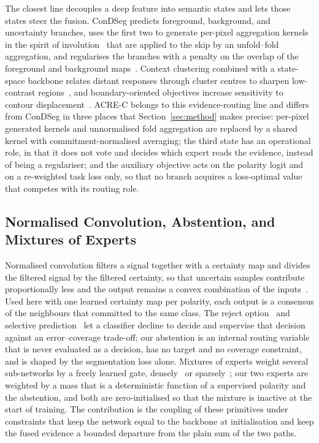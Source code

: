 The closest line decouples a deep feature into semantic states and lets those states steer the fusion. ConDSeg predicts foreground, background, and uncertainty branches, uses the first two to generate per-pixel aggregation kernels in the spirit of involution~\cite{li2021involution} that are applied to the skip by an unfold--fold aggregation, and regularises the branches with a penalty on the overlap of the foreground and background maps~\cite{lei2025condseg}. Context clustering combined with a state-space backbone relates distant responses through cluster centres to sharpen low-contrast regions~\cite{zhu2025ccvim}, and boundary-oriented objectives increase sensitivity to contour displacement~\cite{kervadec2019boundary,karimi2019reducing,wang2022banet}. ACRE-C belongs to this evidence-routing line and differs from ConDSeg in three places that Section~\ref{sec:method} makes precise: per-pixel generated kernels and unnormalised fold aggregation are replaced by a shared kernel with commitment-normalised averaging; the third state has an operational role, in that it does not vote and decides which expert reads the evidence, instead of being a regulariser; and the auxiliary objective acts on the polarity logit and on a re-weighted task loss only, so that no branch acquires a loss-optimal value that competes with its routing role.

\subsection{Normalised Convolution, Abstention, and Mixtures of Experts}

Normalised convolution filters a signal together with a certainty map and divides the filtered signal by the filtered certainty, so that uncertain samples contribute proportionally less and the output remains a convex combination of the inputs~\cite{knutsson1993normalized}. Used here with one learned certainty map per polarity, each output is a consensus of the neighbours that committed to the same class. The reject option~\cite{chow1970reject} and selective prediction~\cite{geifman2017selective} let a classifier decline to decide and supervise that decision against an error--coverage trade-off; our abstention is an internal routing variable that is never evaluated as a decision, has no target and no coverage constraint, and is shaped by the segmentation loss alone. Mixtures of experts weight several sub-networks by a freely learned gate, densely~\cite{jacobs1991mixtures} or sparsely~\cite{shazeer2017moe}; our two experts are weighted by a mass that is a deterministic function of a supervised polarity and the abstention, and both are zero-initialised so that the mixture is inactive at the start of training. The contribution is the coupling of these primitives under constraints that keep the network equal to the backbone at initialisation and keep the fused evidence a bounded departure from the plain sum of the two paths.
